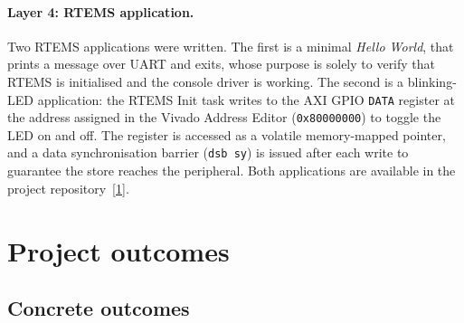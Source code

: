 \documentclass[10pt,a4]{article}
\begin{document}
\paragraph{Layer 4: RTEMS application.}
Two RTEMS applications were written.
The first is a minimal \textit{Hello World}, that prints a message over UART
and exits, whose purpose is solely to verify that RTEMS is initialised and the
console driver is working.
The second is a blinking-LED application: the RTEMS Init task writes to the
AXI GPIO \texttt{DATA} register at the address assigned in the Vivado Address
Editor (\texttt{0x80000000}) to toggle the LED on and off.
The register is accessed as a volatile memory-mapped pointer, and a data
synchronisation barrier (\texttt{dsb sy}) is issued after each write to
guarantee the store reaches the peripheral.
Both applications are available in the project repository~\hyperlink{github}{[1]}.


\section{Project outcomes}

\subsection{Concrete outcomes}
\end{document}
